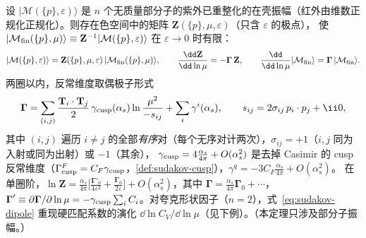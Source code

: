 \begin{theorem}\label{thm:sudakov-ir-poles}
设 $|\mathcal M(\{p\},\varepsilon)\rangle$ 是 $n$ 个无质量部分子的紫外已重整化的在壳振幅（红外由维数正规化正规化）。则存在色空间中的矩阵 $\mathbf Z(\{p\},\mu,\varepsilon)$（只含 $\varepsilon$ 的极点），
使 $|\mathcal M_{\rm fin}(\{p\},\mu)\rangle\equiv\mathbf Z^{-1}|\mathcal M(\{p\},\varepsilon)\rangle$ 在 $\varepsilon\to0$ 时有限：
\begin{equation}\label{eq:sudakov-Zfact}
|\mathcal M(\{p\},\varepsilon)\rangle=\mathbf Z(\{p\},\mu,\varepsilon)\,|\mathcal M_{\rm fin}(\{p\},\mu)\rangle,\qquad
\frac{\dd\mathbf Z}{\dd\ln\mu}=-\boldsymbol\Gamma\,\mathbf Z,\qquad \frac{\dd}{\dd\ln\mu}|\mathcal M_{\rm fin}\rangle=\boldsymbol\Gamma\,|\mathcal M_{\rm fin}\rangle .
\end{equation}
两圈以内，反常维度取偶极子形式
\begin{equation}\label{eq:sudakov-dipole}
\boldsymbol\Gamma=\sum_{(i,j)}\frac{\mathbf T_i\cdot\mathbf T_j}{2}\,\gamma_{\rm cusp}(\alpha_s)\ln\frac{\mu^2}{-s_{ij}}+\sum_i\gamma^i(\alpha_s),\qquad s_{ij}=2\sigma_{ij}\,p_i\cdot p_j+\ii0,
\end{equation}
其中 $(i,j)$ 遍历 $i\ne j$ 的全部\emph{有序}对（每个无序对计两次），$\sigma_{ij}=+1$（$i,j$ 同为入射或同为出射）或 $-1$（其余），
$\gamma_{\rm cusp}=4\frac{\alpha_s}{4\pi}+O(\alpha_s^2)$ 是去掉 Casimir 的 cusp 反常维度（$\Gamma^F_{\rm cusp}=C_F\gamma_{\rm cusp}$，\cref{def:sudakov-cusp}），$\gamma^q=-3C_F\frac{\alpha_s}{4\pi}+O(\alpha_s^2)$。
在单圈阶，$\ln\mathbf Z=\frac{\alpha_s}{4\pi}\big[\frac{\boldsymbol\Gamma'_0}{4\varepsilon^2}+\frac{\boldsymbol\Gamma_0}{2\varepsilon}\big]+O(\alpha_s^2)$，其中 $\boldsymbol\Gamma=\frac{\alpha_s}{4\pi}\boldsymbol\Gamma_0+\cdots$，
$\boldsymbol\Gamma'\equiv\partial\boldsymbol\Gamma/\partial\ln\mu=-\gamma_{\rm cusp}\sum_iC_i$。对夸克形状因子（$n=2$），式~\eqref{eq:sudakov-dipole} 重现硬匹配系数的演化 $\dd\ln C_V/\dd\ln\mu$（见下例）。（本定理只涉及部分子振幅。）
\end{theorem}

